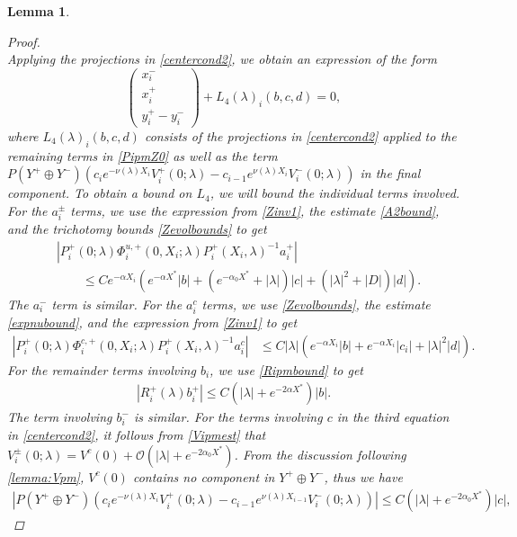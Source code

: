 \documentclass[12pt]{elsarticle}
\theoremstyle{plain}
\newtheorem{lemma}[theorem]{Lemma}
\theoremstyle{definition}
\theoremstyle{remark}
\numberwithin{theorem}{section}
\numberwithin{equation}{section}
\begin{document}
\begin{lemma}
\begin{proof}
\begin{equation}
\end{equation}
Applying the projections in \cref{centercond2}, we obtain an expression of the form
\begin{equation}\label{projxy}
\begin{pmatrix}x_i^- \\ x_i^+ \\ 
y_i^+ - y_i^- \end{pmatrix} 
+ L_4(\lambda)_i(b, c, d) = 0,
\end{equation}
where $L_4(\lambda)_i(b, c, d)$ consists of the projections in \cref{centercond2} applied to the remaining terms in \cref{PipmZ0} as well as the term $P(Y^+ \oplus Y^-) ( c_i e^{-\nu(\lambda)X_i}V_i^+(0; \lambda) - c_{i-1} e^{\nu(\lambda)X_i} V_i^-(0; \lambda) )$ in the final component. To obtain a bound on $L_4$, we will bound the individual terms involved. For the $a_i^\pm$ terms, we use the expression from \cref{Zinv1}, the estimate \cref{A2bound}, and the trichotomy bounds \cref{Zevolbounds} to get
\begin{align*}
&|P_i^+(0; \lambda) \Phi_i^{u,+}(0, X_i; \lambda) P_i^+(X_i, \lambda)^{-1} a_i^+| \\
&\qquad\leq C e^{-\alpha X_i} \left( e^{-\alpha X^*} |b| + (e^{-\alpha_0 X^*} + |\lambda|)|c| + (|\lambda|^2 + |D|)|d| \right).
\end{align*}
The $a_i^-$ term is similar. For the $a_i^c$ terms, we use \cref{Zevolbounds}, the estimate \cref{expnubound}, and the expression from \cref{Zinv1} to get
\begin{align*}
| P_i^+(0; \lambda) \Phi_i^{c,+}(0, X_i; \lambda) P_i^+(X_i, \lambda)^{-1} a_i^c | &\leq C |\lambda| \left( e^{-\alpha X_i} |b| + e^{-\alpha X_i} |c_i| +|\lambda|^2 |d| \right).
\end{align*}
For the remainder terms involving $b_i$, we use \cref{Ripmbound} to get
\begin{align*}
|R_i^+(\lambda) b_i^+|\leq C \left(|\lambda| + e^{-2 \alpha X^*}\right)|b|.
\end{align*}
The term involving $b_i^-$ is similar. For the terms involving $c$ in the third equation in \cref{centercond2}, it follows from \cref{Vipmest} that $V_i^\pm(0; \lambda) = V^c(0) + \mathcal{O}(|\lambda| + e^{-2 \alpha_0 X^*})$. From the discussion following \cref{lemma:Vpm}, $V^c(0)$ contains no component in $Y^+ \oplus Y^-$, thus we have
\begin{align*}
|P(Y^+ \oplus Y^-) ( c_i e^{-\nu(\lambda)X_i}V_i^+(0; \lambda) - c_{i-1} e^{\nu(\lambda)X_{i-1}} V_i^-(0; \lambda) ) | \leq C (|\lambda| + e^{-2 \alpha_0 X^*})|c|,

\end{align*}
\end{proof}
\end{lemma}
\end{document}
